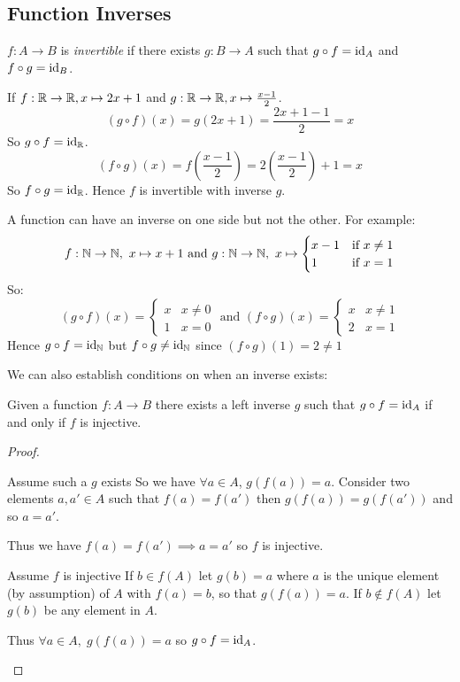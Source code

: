 \documentclass[../main.tex]{subfiles}
\begin{document}
\subsection{Function Inverses}
\begin{definition}[Invertible]
  $f: A \to B$ is \textit{invertible} if there exists $g: B \to A$ such that $g \circ f =\mathrm{id}_A$ and $f \circ g = \mathrm{id}_B$.
\end{definition}
\begin{example}
  If $f: \mathbb{R} \to \mathbb{R}, x\mapsto 2x + 1$ and $g: \mathbb{R} \to \mathbb{R}, x\mapsto \frac{x-1}{2}$.
  \[
    (g \circ f)(x) = g(2x + 1) = \frac{2x + 1 - 1}{2} = x
  \]
  So $g \circ f = \mathrm{id}_{\mathbb{R}}$.
  \[
    (f \circ g)(x) = f\left(\frac{x-1}{2}\right) = 2\left(\frac{x-1}{2}\right) + 1 = x
  \]
  So $f \circ g = \mathrm{id}_{\mathbb{R}}$.
  Hence $f$ is invertible with inverse $g$.
\end{example}
\begin{remark}[Warning]
  A function can have an inverse on one side but not the other. For example:
  \[
    f: \mathbb{N} \to \mathbb{N},\ x \mapsto x + 1 \text{ and } g: \mathbb{N} \to \mathbb{N},\ x \mapsto \begin{cases}
    x - 1 & \text{if } x \neq 1 \\
    1 & \text{if } x = 1
    \end{cases}
  \]
  So:
  \[
    (g \circ f)(x) = \begin{cases}
      x & x \neq 0 \\
      1 & x = 0
    \end{cases}
    \text{ and }
    (f \circ g)(x) = \begin{cases}
      x & x \neq 1 \\
      2 & x = 1
    \end{cases}
  \]
  Hence $g \circ f = \mathrm{id}_{\mathbb{N}}$ but $f \circ g \neq \mathrm{id}_{\mathbb{N}}$ since $(f \circ g)(1) = 2 \neq 1$
\end{remark}
We can also establish conditions on when an inverse exists:
\begin{proposition}
  Given a function $f: A \to B$ there exists a left inverse $g$ such that $g \circ f = \mathrm{id}_A$ if and only if $f$ is injective.
  \label{invInjective}
\end{proposition}
\begin{proof}
  \begin{proofdirection}{Assume such a $g$ exists}
    So we have $\forall a \in A$, $g(f(a)) = a$.
    Consider two elements $a, a' \in A$ such that $f(a) = f(a')$ then $g(f(a)) = g(f(a'))$ and so $a = a'$.

    Thus we have $f(a) = f(a') \implies a = a'$ so $f$ is injective.
  \end{proofdirection}
  \begin{proofdirection}{Assume $f$ is injective}
    If $b \in f(A)$ let $g(b) = a$ where $a$ is the unique element (by assumption) of $A$ with $f(a) = b$, so that $g(f(a)) = a$.
    If $b \notin f(A)$ let $g(b)$ be any element in $A$.

    Thus $\forall a \in A,\; g(f(a)) = a$ so $g \circ f = \mathrm{id}_A$.
  \end{proofdirection}
\end{proof}
\end{document}
